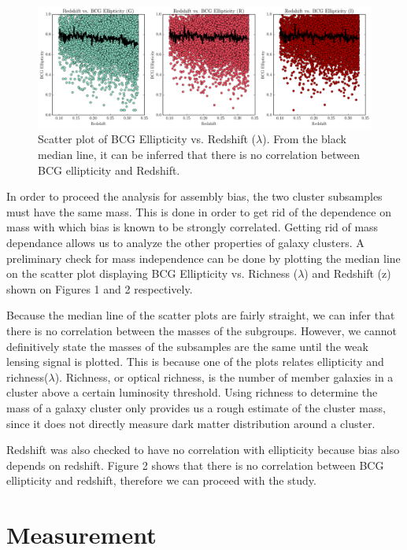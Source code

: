 \documentclass[iop]{emulateapj}
\begin{document}
	\begin{figure}[h]
		\includegraphics[width = \linewidth]{Redshift}
		\caption{Scatter plot of BCG Ellipticity vs. Redshift ($\lambda$). From the black median line, it can be inferred that there is no correlation between BCG ellipticity and Redshift.}
	\end{figure}
In order to proceed the analysis for assembly bias, the two cluster subsamples must have the same mass. This is done in order to get rid of  the dependence on mass with which bias is known to be strongly correlated. Getting rid of mass dependance allows us to analyze the other properties of galaxy clusters. A preliminary check for mass independence can be done by plotting the median line on the scatter plot displaying BCG Ellipticity vs. Richness ($\lambda$) and Redshift (z) shown on Figures 1 and 2 respectively. %

Because the median line of the scatter plots are fairly straight, we can infer that there is no correlation between the masses of the subgroups. However, we cannot definitively state the masses of the subsamples are the same until the weak lensing signal is plotted. This is because one of the plots relates ellipticity and richness($\lambda$). Richness, or optical richness, is the number of member galaxies in a cluster above a certain luminosity threshold. Using richness to determine the mass of a galaxy cluster only provides us a rough estimate of the cluster mass, since it does not directly measure dark matter distribution around a cluster.

Redshift was also checked to have no correlation with ellipticity because bias also depends on redshift. Figure 2 shows that there is no correlation between BCG ellipticity and redshift, therefore we can proceed with the study.

\section{Measurement}
\end{document}
